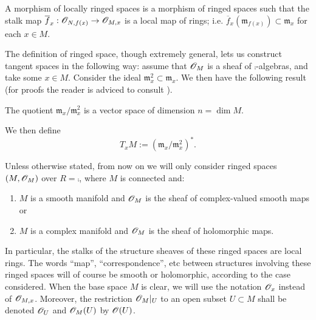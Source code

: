 A morphism of locally ringed spaces is a morphism of ringed spaces such that the stalk map $\overline{f}_x:\mathscr{O}_{N,f(x)}\to \mathscr{O}_{M,x}$ is a local map of rings; i.e. $\overline{f}_x(\mathfrak{m}_{f(x)})\subset \mathfrak{m}_x$ for each $x\in M$.

The definition of ringed space, though extremely general, lets us construct tangent spaces in the following way: assume that $\mathscr{O}_M$ is a sheaf of $\comp$-algebras, and take some $x\in M$. Consider the ideal $\mathfrak{m}_x^2\subset \mathfrak{m}_x$. We then have the following result (for proofs the reader is adviced to consult \cite{kn:warner}).

\begin{lemma}
The quotient $\mathfrak{m}_x/\mathfrak{m}_x^2$ is a vector space of dimension $n=\dim M$.
\end{lemma}

We then define
$$T_xM:=\left (\mathfrak{m}_x/\mathfrak{m}_x^2\right )^*.$$

\begin{obs}
Unless otherwise stated, from now on we will only consider ringed spaces $(M,\mathscr{O}_M)$ over $R=\comp$, where $M$ is connected and:
\begin{enumerate}
\item $M$ is a smooth manifold and $\mathscr{O}_M$ is the sheaf of complex-valued smooth maps or
\item $M$ is a complex manifold and $\mathscr{O}_M$ is the sheaf of holomorphic maps.
\end{enumerate}
In particular, the stalks of the structure sheaves of these ringed spaces are local rings. The words ``map'', ``correspondence'', etc between structures involving these ringed spaces will of course be smooth or holomorphic, according to the case considered. When the base space $M$ is clear, we will use the notation $\mathscr{O}_x$ instead of $\mathscr{O}_{M,x}$. Moreover, the restriction $\mathscr{O}_M|_U$ to an open subset $U\subset M$ shall be denoted $\mathscr{O}_U$ and $\mathscr{O}_M(U)$ by $\mathscr{O}(U)$.
\end{obs}


